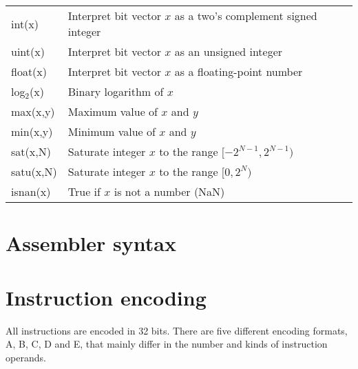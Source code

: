 \begin{tabular}{lp{170pt}}
int(x) & Interpret bit vector $x$ as a two's complement signed integer \\
uint(x) & Interpret bit vector $x$ as an unsigned integer \\
float(x) & Interpret bit vector $x$ as a floating-point number \\
log$_{2}$(x) & Binary logarithm of $x$ \\
max(x,y) & Maximum value of $x$ and $y$ \\
min(x,y) & Minimum value of $x$ and $y$ \\
sat(x,N) & Saturate integer $x$ to the range $[-2^{N-1},2^{N-1})$ \\
satu(x,N) & Saturate integer $x$ to the range $[0,2^{N})$ \\
isnan(x) & True if $x$ is not a number (NaN) \\
\end{tabular}

\section{Assembler syntax}

\tbd

\section{Instruction encoding}

All instructions are encoded in 32 bits. There are five different encoding
formats, A, B, C, D and E, that mainly differ in the number and kinds of
instruction operands.


